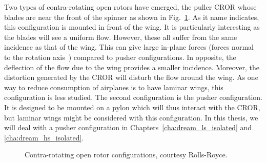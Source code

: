 Two types of contra-rotating open rotors have emerged, the
puller CROR whose blades are near the front of the spinner as 
shown in Fig.~\ref{fig:cror_configurations}. As it
name indicates, this configuration is mounted in front of the
wing. It is particularly interesting as the blades will see
a uniform flow. However, these all suffer from the same incidence as that
of the wing. This can give large in-plane forces 
(forces normal to the rotation axis~\cite{ThesisFrancois}) compared to pusher
configurations. In opposite, the deflection of the flow due to the wing provides
a smaller incidence.
Moreover, the distortion generated
by the CROR will disturb the flow around the wing. As one way to reduce
consumption of airplanes is to have laminar wings, this configuration
is less studied. The second configuration is the pusher
configuration. It is designed to be mounted on a pylon which will thus
interact with the CROR, but laminar wings might be considered with
this configuration. In this thesis, we will deal with a pusher configuration
in Chapters~\ref{cha:dream_ls_isolated} and
\ref{cha:dream_hs_isolated}.
\begin{figure}[htp]
  \centering
  \caption{Contra-rotating open rotor configurations, courtesy Rolls-Royce.}
  \label{fig:cror_configurations}
\end{figure}

